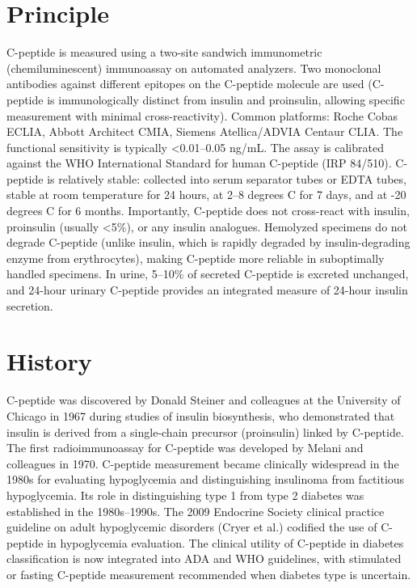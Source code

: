 \section*{Principle}
C-peptide is measured using a two-site sandwich immunometric (chemiluminescent) immunoassay on automated analyzers. Two monoclonal antibodies against different epitopes on the C-peptide molecule are used (C-peptide is immunologically distinct from insulin and proinsulin, allowing specific measurement with minimal cross-reactivity). Common platforms: Roche Cobas ECLIA, Abbott Architect CMIA, Siemens Atellica/ADVIA Centaur CLIA. The functional sensitivity is typically <0.01--0.05 ng/mL. The assay is calibrated against the WHO International Standard for human C-peptide (IRP 84/510). C-peptide is relatively stable: collected into serum separator tubes or EDTA tubes, stable at room temperature for 24 hours, at 2--8 degrees C for 7 days, and at -20 degrees C for 6 months. Importantly, C-peptide does not cross-react with insulin, proinsulin (usually <5\%), or any insulin analogues. Hemolyzed specimens do not degrade C-peptide (unlike insulin, which is rapidly degraded by insulin-degrading enzyme from erythrocytes), making C-peptide more reliable in suboptimally handled specimens. In urine, 5--10\% of secreted C-peptide is excreted unchanged, and 24-hour urinary C-peptide provides an integrated measure of 24-hour insulin secretion.

\section*{History}
C-peptide was discovered by Donald Steiner and colleagues at the University of Chicago in 1967 during studies of insulin biosynthesis, who demonstrated that insulin is derived from a single-chain precursor (proinsulin) linked by C-peptide. The first radioimmunoassay for C-peptide was developed by Melani and colleagues in 1970. C-peptide measurement became clinically widespread in the 1980s for evaluating hypoglycemia and distinguishing insulinoma from factitious hypoglycemia. Its role in distinguishing type 1 from type 2 diabetes was established in the 1980s--1990s. The 2009 Endocrine Society clinical practice guideline on adult hypoglycemic disorders (Cryer et al.) codified the use of C-peptide in hypoglycemia evaluation. The clinical utility of C-peptide in diabetes classification is now integrated into ADA and WHO guidelines, with stimulated or fasting C-peptide measurement recommended when diabetes type is uncertain.

